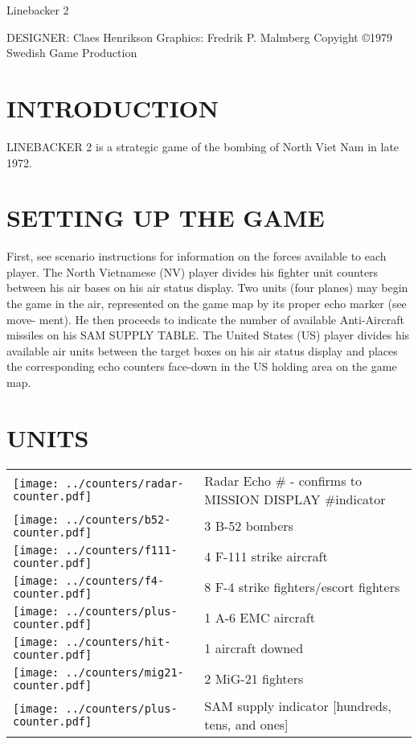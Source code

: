 Linebacker 2

DESIGNER: Claes Henrikson
Graphics: Fredrik P. Malmberg
Copyight ©1979
Swedish Game Production

\section*{INTRODUCTION}
LINEBACKER 2 is a strategic game
of the bombing of North Viet Nam in
late 1972.

\section*{SETTING UP THE GAME}
First, see scenario instructions for
information on the forces available
to each player. The North Vietnamese
(NV) player divides his fighter unit
counters between his air bases on his
air status display. Two units (four
planes) may begin the game in the
air, represented on the game map by
its proper echo marker (see move-
ment). He then proceeds to indicate
the number of available Anti-Aircraft
missiles on his SAM SUPPLY TABLE.
The United States (US) player
divides his available air units between
the target boxes on his air status
display and places the corresponding
echo counters face-down in the US
holding area on the game map.

\newcommand{\bfiftytwo}{\texttt{[image: ../counters/b52-counter.pdf]}}
\newcommand{\ffour}{\texttt{[image: ../counters/f4-counter.pdf]}}
\newcommand{\foneeleven}{\texttt{[image: ../counters/f111-counter.pdf]}}
\newcommand{\plus}{\texttt{[image: ../counters/plus-counter.pdf]}}
\newcommand{\migtwoone}{\texttt{[image: ../counters/mig21-counter.pdf]}}
\newcommand{\radar}{\texttt{[image: ../counters/radar-counter.pdf]}}
\newcommand{\hit}{\texttt{[image: ../counters/hit-counter.pdf]}}
\newcommand{\graphic}{\texttt{[image: ../counters/plus-counter.pdf]}}

\section*{UNITS}
\noindent
\begin{tabularx}{\linewidth}{@{} m{0.3in} X @{}}
   \radar & Radar Echo \# - confirms to MISSION DISPLAY \#indicator \\
   \bfiftytwo & 3 B-52 bombers \\
   \foneeleven & 4 F-111 strike aircraft \\
   \ffour & 8 F-4 strike fighters/escort fighters \\
   \plus & 1 A-6 EMC aircraft \\
   \hit & 1 aircraft downed \\
   \migtwoone & 2 MiG-21 fighters \\
   \graphic & SAM supply indicator [hundreds, tens, and ones] \\
 \end{tabularx}


